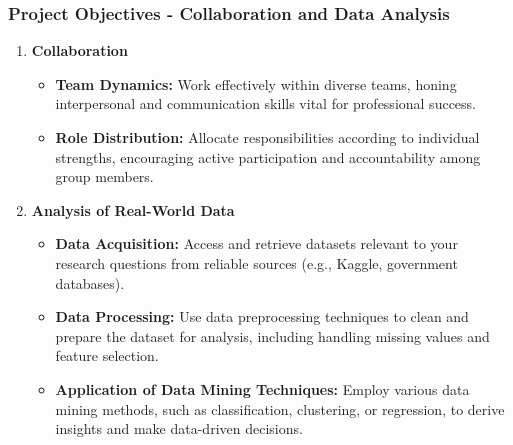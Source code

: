 \documentclass[aspectratio=169]{beamer}
\begin{document}
\begin{frame}[fragile]
    \frametitle{Project Objectives - Collaboration and Data Analysis}
    \begin{enumerate}
        \item \textbf{Collaboration}
        \begin{itemize}
            \item \textbf{Team Dynamics:} Work effectively within diverse teams, honing interpersonal and communication skills vital for professional success.
            \item \textbf{Role Distribution:} Allocate responsibilities according to individual strengths, encouraging active participation and accountability among group members.
        \end{itemize}
        
        \item \textbf{Analysis of Real-World Data}
        \begin{itemize}
            \item \textbf{Data Acquisition:} Access and retrieve datasets relevant to your research questions from reliable sources (e.g., Kaggle, government databases).
            \item \textbf{Data Processing:} Use data preprocessing techniques to clean and prepare the dataset for analysis, including handling missing values and feature selection.
            \item \textbf{Application of Data Mining Techniques:} Employ various data mining methods, such as classification, clustering, or regression, to derive insights and make data-driven decisions.
        \end{itemize}
    \end{enumerate}
\end{frame}
\end{document}
